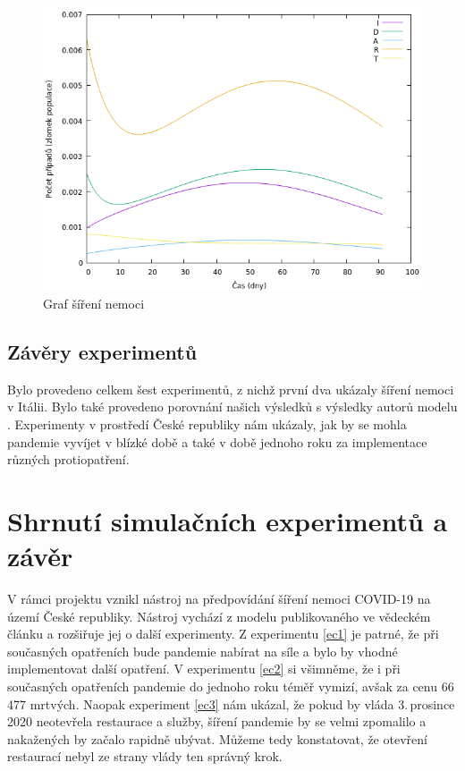\documentclass[a4paper,11pt]{article}
\begin{document}
			\begin{figure}[H]
				\caption{Graf šíření nemoci}
				\label{fig7}
				\centering
				\includegraphics[scale=0.6]{exp_cz4.png}
			\end{figure}
		
		\subsection{Závěry experimentů}
		Bylo provedeno celkem šest experimentů, z nichž první dva ukázaly šíření nemoci v Itálii. Bylo také provedeno porovnání našich výsledků s výsledky autorů modelu \cite{source}. Experimenty v prostředí České republiky nám ukázaly, jak by se mohla pandemie vyvíjet v blízké době a také v době jednoho roku za implementace různých protiopatření.
		
	\section{Shrnutí simulačních experimentů a závěr}
		V rámci projektu vznikl nástroj na předpovídání šíření nemoci COVID-19 na území České republiky. Nástroj vychází z modelu publikovaného ve vědeckém článku \cite{source} a rozšiřuje jej o další experimenty. Z experimentu \ref{ec1} je patrné, že při současných opatřeních bude pandemie nabírat na síle a bylo by vhodné implementovat další opatření. V experimentu \ref{ec2} si všimněme, že i při současných opatřeních pandemie do jednoho roku téměř vymizí, avšak za cenu 66\,477 mrtvých. Naopak experiment \ref{ec3} nám ukázal, že pokud by vláda 3.\,prosince 2020 neotevřela restaurace a služby, šíření pandemie by se velmi zpomalilo a nakažených by začalo rapidně ubývat. Můžeme tedy konstatovat, že otevření restaurací nebyl ze strany vlády ten správný krok.

	\newpage
	
	\renewcommand{\refname}{Literatura}
	
\end{document}
